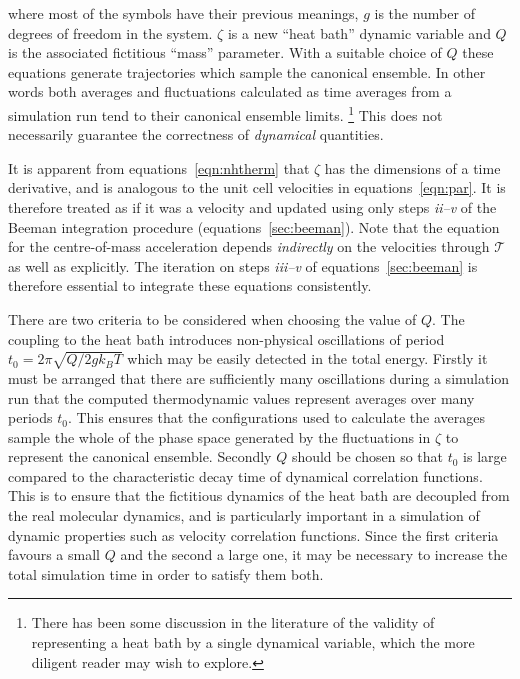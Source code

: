 \documentclass[a4paper,twoside]{report}
\begin{document}
\noindent
where most of the symbols have their previous meanings, $g$ is the
number of degrees of freedom in the system. $\zeta$ is a new ``heat
bath'' dynamic variable and $Q$ is the associated fictitious ``mass''
parameter.  With a suitable choice of $Q$ these equations generate
trajectories which sample the canonical ensemble\cite{nose:84}.  In
other words both averages and fluctuations calculated as time averages
from a simulation run tend to their canonical ensemble limits.%
\footnote{There has been some discussion in the literature of the
  validity of representing a heat bath by a single dynamical variable,
  which the more diligent reader may wish to
  explore\cite{cho:93,nose:91}.} This does not necessarily guarantee
the correctness of \emph{dynamical} quantities.

It is apparent from equations~\ref{eqn:nhtherm} that $\zeta$ has the
dimensions of a time derivative, and is analogous to the unit cell
velocities in equations~\ref{eqn:par}.  It is therefore treated as if
it was a velocity and updated using only steps \emph{ii--v} of the
Beeman integration procedure (equations~\ref{sec:beeman}).  Note that
the equation for the centre-of-mass acceleration depends
\emph{indirectly} on the velocities through $\mathcal T$ as well as
explicitly.  The iteration on steps \emph{iii--v} of
equations~\ref{sec:beeman} is therefore essential to integrate these
equations consistently.

There are two criteria to be considered when choosing the value of
$Q$.  The coupling to the heat bath introduces non-physical
oscillations of period $t_0 = 2 \pi \sqrt{Q / 2 g k_B T}$ which may be
easily detected in the total energy\cite{nose:91}.  Firstly it must be
arranged that there are sufficiently many oscillations during a
simulation run that the computed thermodynamic values represent
averages over many periods $t_0$. This ensures that the configurations
used to calculate the averages sample the whole of the phase space
generated by the fluctuations in $\zeta$ to represent the canonical
ensemble.  Secondly $Q$ should be chosen so that $t_0$ is large
compared to the characteristic decay time of dynamical correlation
functions. This is to ensure that the fictitious dynamics of the heat
bath are decoupled from the real molecular dynamics, and is
particularly important in a simulation of dynamic
properties\cite{cho:92} such as velocity correlation functions. Since
the first criteria favours a small $Q$ and the second a large one, it
may be necessary to increase the total simulation time in order to
satisfy them both.
\end{document}
